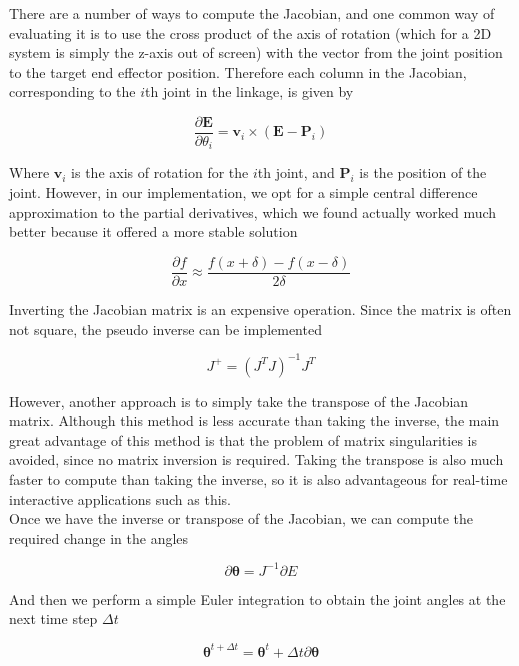 \documentclass[paper=a4, fontsize=11pt]{scrartcl} %
\numberwithin{equation}{section} %
\numberwithin{figure}{section} %
\numberwithin{table}{section} %
\newcommand{\vect}[1]{\mathbf{#1}}
\newcommand{\params}{\boldsymbol{\theta}}
\newcommand{\dn}[1]{\partial{#1}}
\begin{document}
There are a number of ways to compute the Jacobian, and one common way of evaluating it is to use the cross product of the axis of rotation (which for a 2D system is simply the z-axis out of screen) with the vector from the joint position to the target end effector position. Therefore each column in the Jacobian, corresponding to the $i$th joint in the linkage, is given by

\begin{equation}
\frac{\dn{\vect{E}}}{\dn{\theta_i}} = \vect{v}_i \times (\vect{E} - \vect{P}_i)
\end{equation}

Where $\vect{v}_i$ is the axis of rotation for the $i$th joint, and $\vect{P}_i$ is the position of the joint. However, in our implementation, we opt for a simple central difference approximation to the partial derivatives, which we found actually worked much better because it offered a more stable solution

\begin{equation}
\frac{\dn{f}}{\dn{x}} \approx \frac{f(x+\delta) - f(x-\delta)}{2\delta} 
\end{equation}
 
Inverting the Jacobian matrix is an expensive operation. Since the matrix is often not square, the pseudo inverse can be implemented

\begin{equation}
J^+ = (J^TJ)^{-1}J^T
\end{equation}

However, another approach is to simply take the transpose of the Jacobian matrix. Although this method is less accurate than taking the inverse, the main great advantage of this method is that the problem of matrix singularities is avoided, since no matrix inversion is required. Taking the transpose is also much faster to compute than taking the inverse, so it is also advantageous for real-time interactive applications such as this. \\

Once we have the inverse or transpose of the Jacobian, we can compute the required change in the angles

\begin{equation}
\partial \params = J^{-1} \partial E
\end{equation}

And then we perform a simple Euler integration to obtain the joint angles at the next time step $\Delta t$

\begin{equation}
\params^{t+\Delta t} = \params^t + \Delta t \partial \params
\end{equation}
\end{document}
